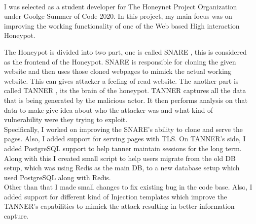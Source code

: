 \newpage
\thispagestyle{empty}

\begin{center}
\\[1.5cm]
\end{center}
\begin{flushleft}
I was selected as a student developer \cite{b1} for The Honeynet Project Organization under Goolge Summer of Code 2020. In this project, my main focus was on improving the working functionality of one of the Web based High interaction Honeypot.

\setlength{\parindent}{3ex}
The Honeypot is divided into two part, one is called SNARE \cite{b2}, this is considered as the frontend of the Honeypot. SNARE is responsible for cloning the given website and then uses those cloned webpages to mimick the actual working website. This can gives attacker a feeling of read website. The another part is called TANNER \cite{b3}, its the brain of the honeypot. TANNER captures all the data that is being generated by the malicious actor. It then performs analysis on that data to make give idea about who the attacker was and what kind of vulnerability were they trying to exploit.\\

\setlength{\parindent}{3ex} 
Specifically, I worked on improving the SNARE's ability to clone and serve the pages. Also, I added support for serving pages with TLS. On TANNER's side, I added PostgreSQL support to help tanner maintain sessions for the long term. Along with this I created small script to help users migrate from the old DB setup, which was using Redis as the main DB, to a new database setup which used PostgreSQL along with Redis.\\

\setlength{\parindent}{3ex}
Other than that I made small changes to fix existing bug in the code base. Also, I added support for different kind of Injection templates which improve the TANNER's capabilities to mimick the attack resulting in better information capture.
\end{flushleft}
\vfill